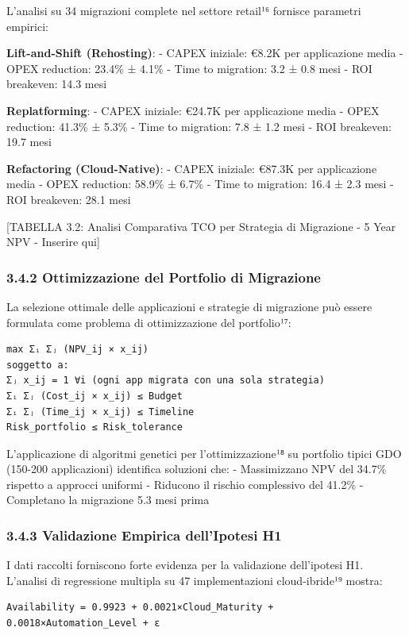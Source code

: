 \documentclass[12pt,a4paper,oneside]{book}
\begin{document}
L'analisi su 34 migrazioni complete nel settore retail¹⁶ fornisce
parametri empirici:

\textbf{Lift-and-Shift (Rehosting)}: - CAPEX iniziale: €8.2K per
applicazione media - OPEX reduction: 23.4\% ± 4.1\% - Time to migration:
3.2 ± 0.8 mesi - ROI breakeven: 14.3 mesi

\textbf{Replatforming}: - CAPEX iniziale: €24.7K per applicazione media
- OPEX reduction: 41.3\% ± 5.3\% - Time to migration: 7.8 ± 1.2 mesi -
ROI breakeven: 19.7 mesi

\textbf{Refactoring (Cloud-Native)}: - CAPEX iniziale: €87.3K per
applicazione media - OPEX reduction: 58.9\% ± 6.7\% - Time to migration:
16.4 ± 2.3 mesi - ROI breakeven: 28.1 mesi

{[}TABELLA 3.2: Analisi Comparativa TCO per Strategia di Migrazione - 5
Year NPV - Inserire qui{]}

\subsubsection{3.4.2 Ottimizzazione del Portfolio di
Migrazione}\label{ottimizzazione-del-portfolio-di-migrazione}

La selezione ottimale delle applicazioni e strategie di migrazione può
essere formulata come problema di ottimizzazione del portfolio¹⁷:

\begin{verbatim}
max Σᵢ Σⱼ (NPV_ij × x_ij)
soggetto a:
Σⱼ x_ij = 1 ∀i (ogni app migrata con una sola strategia)
Σᵢ Σⱼ (Cost_ij × x_ij) ≤ Budget
Σᵢ Σⱼ (Time_ij × x_ij) ≤ Timeline
Risk_portfolio ≤ Risk_tolerance
\end{verbatim}

L'applicazione di algoritmi genetici per l'ottimizzazione¹⁸ su portfolio
tipici GDO (150-200 applicazioni) identifica soluzioni che: -
Massimizzano NPV del 34.7\% rispetto a approcci uniformi - Riducono il
rischio complessivo del 41.2\% - Completano la migrazione 5.3 mesi prima

\subsubsection{3.4.3 Validazione Empirica dell'Ipotesi
H1}\label{validazione-empirica-dellipotesi-h1}

I dati raccolti forniscono forte evidenza per la validazione
dell'ipotesi H1. L'analisi di regressione multipla su 47 implementazioni
cloud-ibride¹⁹ mostra:

\begin{verbatim}
Availability = 0.9923 + 0.0021×Cloud_Maturity + 0.0018×Automation_Level + ε
\end{verbatim}
\end{document}
